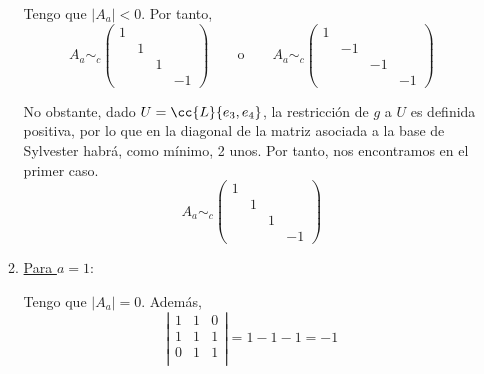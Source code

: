 \begin{ejercicio}
\begin{enumerate}
\begin{enumerate}
            Tengo que $|A_a|<0$. Por tanto,
            \begin{equation*}
                A_a \sim_c \left( \begin{array}{cccc}
                1 &&& \\
                &1&& \\
                &&1&\\
                &&&-1
            \end{array} \right)
            \qquad \text{o} \qquad
            A_a \sim_c \left( \begin{array}{cccc}
                1 &&& \\
                &-1&& \\
                &&-1&\\
                &&&-1
            \end{array} \right)
            \end{equation*}

            No obstante, dado $U=\cc{L}\{e_3, e_4\}$, la restricción de $g$ a $U$ es definida positiva, por lo que en la diagonal de la matriz asociada a la base de Sylvester habrá, como mínimo, 2 unos. Por tanto, nos encontramos en el primer caso.
            \begin{equation*}
                A_a \sim_c \left( \begin{array}{cccc}
                1 &&& \\
                &1&& \\
                &&1&\\
                &&&-1
            \end{array} \right)
            \end{equation*}



            \item \underline{Para $a=1$}:

            Tengo que $|A_a|=0$. Además, 
            \begin{equation*}
                \left| \begin{array}{ccc}
                    1 & 1 & 0 \\
                    1 & 1 & 1 \\
                    0 & 1 & 1 \\
                \end{array} \right|
                = 1-1-1 = -1
            \end{equation*}


\end{enumerate}
\end{enumerate}
\end{ejercicio}
